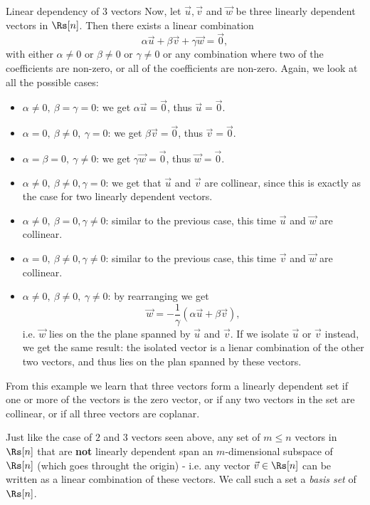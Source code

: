 \begin{example}{Linear dependency of $3$ vectors}{}
	Now, let $\vec{u},\vec{v}$ and $\vec{w}$ be three linearly dependent vectors in $\Rs[n]$. Then there exists a linear combination
	\[
		\alpha\vec{u} + \beta\vec{v} + \gamma\vec{w} = \vec{0},
	\]
	with either $\alpha\neq0$ or $\beta\neq0$ or $\gamma\neq0$ or any combination where two of the coefficients are non-zero, or all of the coefficients are non-zero. Again, we look at all the possible cases:
	\begin{itemize}
		\item $\alpha\neq0,\ \beta=\gamma=0$: we get $\alpha\vec{u} = \vec{0}$, thus $\vec{u}=\vec{0}$.
		\item $\alpha=0,\ \beta\neq0,\ \gamma=0$: we get $\beta\vec{v} = \vec{0}$, thus $\vec{v}=\vec{0}$.
		\item $\alpha=\beta=0,\ \gamma\neq0$: we get $\gamma\vec{w} = \vec{0}$, thus $\vec{w}=\vec{0}$.
		\item $\alpha\neq0,\ \beta\neq0, \gamma=0$: we get that $\vec{u}$ and $\vec{v}$ are collinear, since this is exactly as the case for two linearly dependent vectors.
		\item $\alpha\neq0,\ \beta=0, \gamma\neq0$: similar to the previous case, this time $\vec{u}$ and $\vec{w}$ are collinear.
		\item $\alpha=0,\ \beta\neq0, \gamma\neq0$: similar to the previous case, this time $\vec{v}$ and $\vec{w}$ are collinear.
		\item $\alpha\neq0,\ \beta\neq0,\ \gamma\neq0$: by rearranging we get
			\[
				\vec{w} = -\frac{1}{\gamma}\left( \alpha\vec{u} + \beta\vec{v} \right),
			\]
			i.e. $\vec{w}$ lies on the the plane spanned by $\vec{u}$ and $\vec{v}$. If we isolate $\vec{u}$ or $\vec{v}$ instead, we get the same result: the isolated vector is a lienar combination of the other two vectors, and thus lies on the plan spanned by these vectors.
	\end{itemize}
	From this example we learn that three vectors form a linearly dependent set if one or more of the vectors is the zero vector, or if any two vectors in the set are collinear, or if all three vectors are coplanar.
\end{example}

Just like the case of $2$ and $3$ vectors seen above, any set of $m\leq n$ vectors in $\Rs[n]$ that are \textbf{not} linearly dependent span an $m$-dimensional subspace of $\Rs[n]$ (which goes throught the origin) - i.e. any vector $\vec{v}\in\Rs[n]$ can be written as a linear combination of these vectors. We call such a set a \emph{basis set} of $\Rs[n]$.

